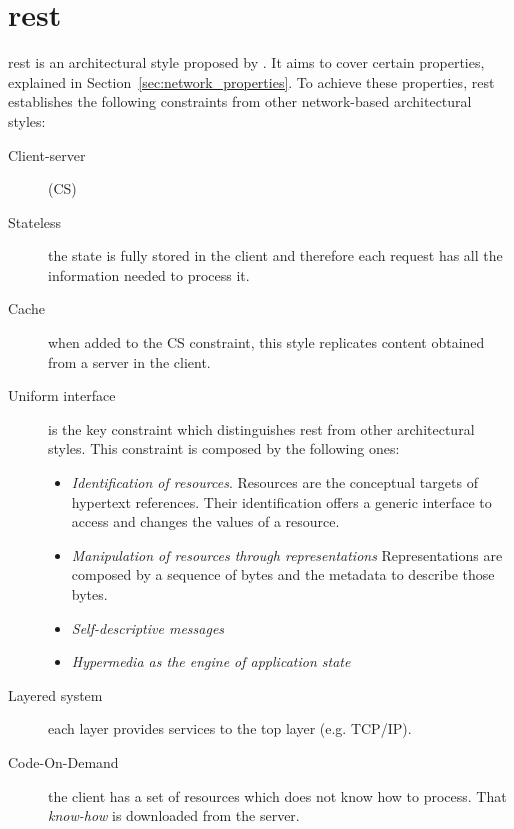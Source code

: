 
\section{\acl{rest}}

\acf{rest} is an architectural style proposed by \citet{fielding_architectural_2000}.
It aims to cover certain properties, explained in Section~\ref{sec:network_properties}.
To achieve these properties, \ac{rest} establishes the following constraints from other network-based architectural styles:
\begin{description}
 \item[Client-server] (CS)
 \item[Stateless] the state is fully stored in the client and therefore each request has all the information needed to process it.
 \item[Cache] when added to the CS constraint, this style replicates content obtained from a server in the client.
 \item[Uniform interface] is the key constraint which distinguishes \ac{rest} from other architectural styles.
                   This constraint is composed by the following ones:
	\begin{itemize}
	  \item \emph{Identification of resources}.
	             Resources are the conceptual targets of hypertext references.
	             Their identification offers a generic interface to access and changes the values of a resource.
	  \item \emph{Manipulation of resources through representations}
	             Representations are composed by a sequence of bytes and the metadata to describe those bytes.
	  \item \emph{Self-descriptive messages}
	  \item \emph{Hypermedia as the engine of application state}
	\end{itemize}
 \item[Layered system] each layer provides services to the top layer (e.g. TCP/IP). %
 \item[Code-On-Demand] the client has a set of resources which does not know how to process.
       That \emph{know-how} is downloaded from the server.
\end{description}


